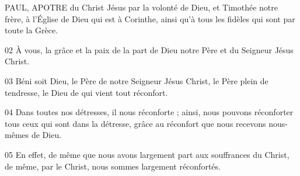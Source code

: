 PAUL, APOTRE du Christ Jésus par la volonté de Dieu, et Timothée notre frère, à l’Église de Dieu qui est à Corinthe, ainsi qu’à tous les fidèles qui sont par toute la Grèce.

02 À vous, la grâce et la paix de la part de Dieu notre Père et du Seigneur Jésus Christ.

03 Béni soit Dieu, le Père de notre Seigneur Jésus Christ, le Père plein de tendresse, le Dieu de qui vient tout réconfort.

04 Dans toutes nos détresses, il nous réconforte ; ainsi, nous pouvons réconforter tous ceux qui sont dans la détresse, grâce au réconfort que nous recevons nous-mêmes de Dieu.

05 En effet, de même que nous avons largement part aux souffrances du Christ, de même, par le Christ, nous sommes largement réconfortés.
